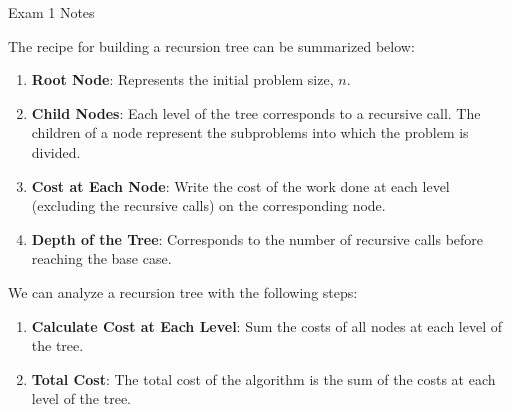 \begin{examnotes}{Exam 1 Notes}
    \begin{highlight}
        The recipe for building a recursion tree can be summarized below:
        \begin{enumerate}
            \item \textbf{Root Node}: Represents the initial problem size, $n$.
            \item \textbf{Child Nodes}: Each level of the tree corresponds to a recursive call. The children of a node represent the subproblems into which the problem is divided.
            \item \textbf{Cost at Each Node}: Write the cost of the work done at each level (excluding the recursive calls) on the corresponding node.
            \item \textbf{Depth of the Tree}: Corresponds to the number of recursive calls before reaching the base case.
        \end{enumerate}
    \end{highlight}

    \begin{highlight}
        We can analyze a recursion tree with the following steps:
        \begin{enumerate}
            \item \textbf{Calculate Cost at Each Level}: Sum the costs of all nodes at each level of the tree.
            \item \textbf{Total Cost}: The total cost of the algorithm is the sum of the costs at each level of the tree.
        \end{enumerate}
    \end{highlight}
\end{examnotes}

